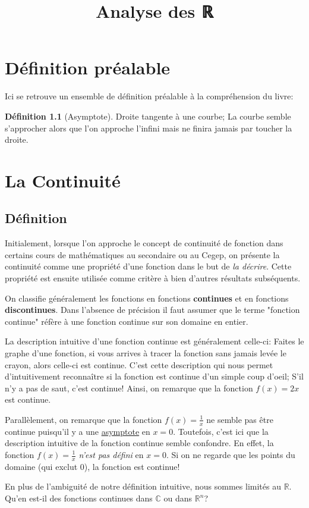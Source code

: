 \documentclass[12pt]{book}
\title{Analyse des ℝ}
\let\Bbb\mathbb
\theoremstyle{definition}
\newtheorem{definition}{Définition}[section]
\begin{document}
\chapter{Définition préalable}
Ici se retrouve un ensemble de définition préalable à la compréhension du livre:
\begin{definition}[Asymptote]
    \label{def:asymptote}
    Droite tangente à une courbe; La courbe semble s'approcher alors que l'on approche l'infini mais ne finira
    jamais par toucher la droite.
\end{definition}

\chapter{La Continuité}
\section{Définition}
Initialement, lorsque l'on approche le concept de continuité de fonction dans certains cours de mathématiques au secondaire ou au 
Cegep, on présente la continuité comme une propriété d'une fonction dans le but de \textit{la décrire}. Cette propriété est ensuite
utilisée comme critère à bien d'autres résultats subséquents.

On classifie généralement les fonctions en fonctions \textbf{continues} et en fonctions \textbf{discontinues}. Dans l'absence de précision
il faut assumer que le terme "fonction continue" réfère à une fonction continue sur son domaine en entier.

La description intuitive d'une fonction continue est généralement celle-ci: Faites le graphe d'une fonction, si vous arrives à tracer
la fonction sans jamais levée le crayon, alors celle-ci est continue. C'est cette description qui nous permet d'intuitivement reconnaître si la fonction est continue d'un simple coup d'oeil;
S'il n'y a pas de saut, c'est continue! Ainsi, on remarque que la fonction $f(x) = 2x$ est continue.

Parallèlement, on remarque que la fonction $f(x) = \frac{1}{x}$ ne semble pas être continue puisqu'il y a une \hyperref[def:asymptote]{asymptote} en $x = 0$.
Toutefois, c'est ici que la description intuitive de la fonction continue semble confondre. En effet, la fonction $f(x) = \frac{1}{x}$ \textit{n'est pas défini} en $x = 0$.
Si on ne regarde que les points du domaine (qui exclut 0), la fonction est continue!

En plus de l'ambiguité de notre définition intuitive, nous sommes limités au $\Bbb{R}$. Qu'en est-il des fonctions continues dans $\Bbb{C}$ ou dans $\Bbb{R}^n$?
\end{document}

